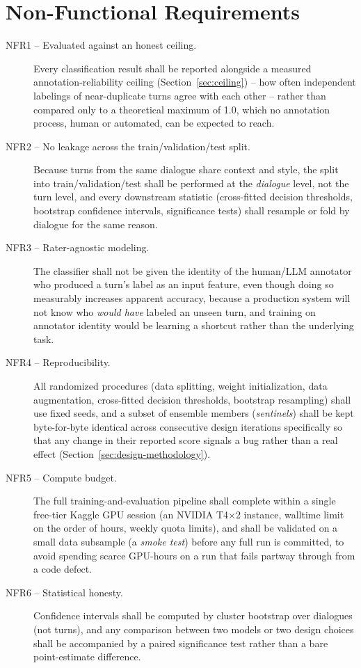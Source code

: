 \section{Non-Functional Requirements}

\begin{description}
\item[NFR1 -- Evaluated against an honest ceiling.] Every classification
  result shall be reported alongside a measured annotation-reliability
  ceiling (Section~\ref{sec:ceiling}) -- how often independent labelings of
  near-duplicate turns agree with each other -- rather than compared only to
  a theoretical maximum of 1.0, which no annotation process, human or
  automated, can be expected to reach.
\item[NFR2 -- No leakage across the train/validation/test split.] Because
  turns from the same dialogue share context and style, the split into
  train/validation/test shall be performed at the \emph{dialogue} level, not
  the turn level, and every downstream statistic (cross-fitted decision
  thresholds, bootstrap confidence intervals, significance tests) shall
  resample or fold by dialogue for the same reason.
\item[NFR3 -- Rater-agnostic modeling.] The classifier shall not be given
  the identity of the human/LLM annotator who produced a turn's label as an
  input feature, even though doing so measurably increases apparent accuracy,
  because a production system will not know who \emph{would have} labeled an
  unseen turn, and training on annotator identity would be learning a
  shortcut rather than the underlying task.
\item[NFR4 -- Reproducibility.] All randomized procedures (data splitting,
  weight initialization, data augmentation, cross-fitted decision thresholds,
  bootstrap resampling) shall use fixed seeds, and a subset of ensemble
  members (\emph{sentinels}) shall be kept byte-for-byte identical across
  consecutive design iterations specifically so that any change in their
  reported score signals a bug rather than a real effect
  (Section~\ref{sec:design-methodology}).
\item[NFR5 -- Compute budget.] The full training-and-evaluation pipeline
  shall complete within a single free-tier Kaggle GPU session (an NVIDIA
  T4$\times$2 instance, walltime limit on the order of hours, weekly quota
  limits), and shall be validated on a small data subsample (a
  \emph{smoke test}) before any full run is committed, to avoid spending
  scarce GPU-hours on a run that fails partway through from a code defect.
\item[NFR6 -- Statistical honesty.] Confidence intervals shall be computed
  by cluster bootstrap over dialogues (not turns), and any comparison
  between two models or two design choices shall be accompanied by a paired
  significance test rather than a bare point-estimate difference.
\end{description}

